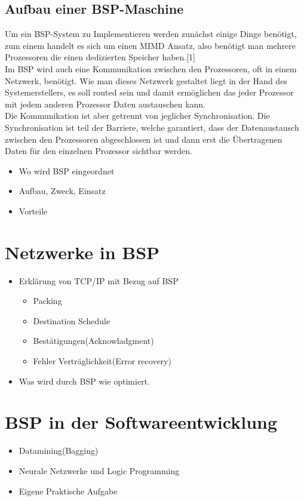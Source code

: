 \documentclass[a4paper,10pt]{scrartcl}
\begin{document}
\subsection{Aufbau einer BSP-Maschine}
Um ein BSP-System zu Implementieren werden zunächst einige Dinge benötigt, zum einem handelt es sich um einen MIMD Ansatz, also benötigt man mehrere Prozessoren die einen dedizierten Speicher haben.[1]\\
Im BSP wird auch eine Kommunikation zwischen den Prozessoren, oft in einem Netzwerk, benötigt. Wie man dieses Netzwerk gestaltet liegt in der Hand des Systemerstellers, es soll routed sein und damit ermöglichen das jeder Prozessor mit jedem anderen Prozessor Daten austauschen kann.\\
Die Kommunikation ist aber getrennt von jeglicher Synchronisation. Die Synchronisation ist teil der Barriere, welche garantiert, dass der Datenaustausch zwischen den Prozessoren abgeschlossen ist und dann erst die Übertragenen Daten für den einzelnen Prozessor sichtbar werden.

\begin{itemize}
\item Wo wird BSP eingeordnet
\item Aufbau, Zweck, Einsatz
\item Vorteile
\end{itemize}
\section{Netzwerke in BSP}
\begin{itemize}
\item Erklärung von TCP/IP mit Bezug auf BSP
\begin{itemize}
\item Packing
\item Destination Schedule
\item Bestätigungen(Acknowladgment)
\item Fehler Verträglichkeit(Error recovery)
\end{itemize}
\item Was wird durch BSP wie optimiert.

\end{itemize}
\section{BSP in der Softwareentwicklung}
\begin{itemize}
\item Datamining(Bagging)
\item Neurale Netzwerke und Logic Programming
\item Eigene Praktische Aufgabe
\end{itemize}
\end{document}
